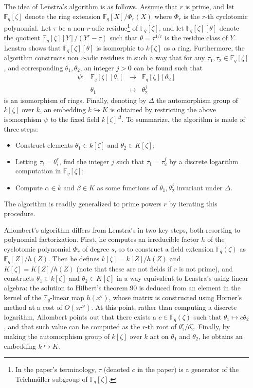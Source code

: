 \documentclass[12pt]{article}
\theoremstyle{plain}
\theoremstyle{definition}
\def\F{\ensuremath{\mathbb{F}}}
\newcounter{algorithm}
\begin{document}
The idea of Lenstra's algorithm is as follows.
Assume that $r$ is prime, and
let $\F_q[\zeta]$ denote the ring extension $\F_q[X] / \Phi_r(X)$ where $\Phi_r$ is the $r$-th 
cyclotomic polynomial. 
Let $\tau$ be a non $r$-adic residue\footnote{In the paper's terminology, $\tau$ (denoted $c$ in the paper) is a generator of the Teichm\"uller subgroup of $\F_q[\zeta]$.} of $\F_q[\zeta]$,
and let $\F_q[\zeta][\theta]$ denote the quotient $\F_q[\zeta][Y]/(Y^r - 
\tau)$ such that $\theta=\tau^{1/r}$ is the residue class of $Y$.
Lenstra shows that $\F_q[\zeta][\theta]$ is isomorphic to $k[\zeta]$ as a ring.
Furthermore, the algorithm constructs non $r$-adic residues in such a way that for any $\tau_1, \tau_2 \in \F_q[\zeta]$, 
and corresponding $\theta_1, \theta_2$,
an integer $j > 0$  can be found such that
\[
\begin{array}{lrll}
\psi: & \F_q[\zeta][\theta_1] & \rightarrow & \F_q[\zeta][\theta_2] \\
& \theta_1 & \mapsto & \theta_2^j
\end{array}
\]
is an isomorphism of rings.
Finally, denoting by $\Delta$ the automorphism group of $k[\zeta]$
over $k$, an embedding $k \hookrightarrow K$ is obtained by
restricting the above isomorphism $\psi$ to the fixed field
$k[\zeta]^\Delta$.
To summarize, the algorithm is made of three steps:
\begin{itemize}
\item Construct elements $\theta_1\in k[\zeta]$ and $\theta_2\in K[\zeta]$;
\item Letting $\tau_i=\theta_i^r$, find the integer $j$ such that
  $\tau_1=\tau_2^j$ by a discrete logarithm computation in
  $\F_q[\zeta]$;
\item Compute $\alpha\in k$ and $\beta\in K$ as some functions of
  $\theta_1,\theta_2^j$ invariant under $\Delta$.
\end{itemize}
The algorithm is readily generalized to prime powers $r$ by iterating
this procedure.

Allombert's algorithm differs from Lenstra's in two key steps, both
resorting to polynomial factorization.  First, he computes an
irreducible factor $h$ of the cyclotomic polynomial $\Phi_r$
of degree $s$, so to
construct a field extension $\F_q(\zeta)$ as $\F_q[Z]/h(Z)$.  Then he
defines $k[\zeta]=k[Z]/h(Z)$ and $K[\zeta]=K[Z]/h(Z)$ (note that these
are not fields if $r$ is not prime), and constructs
$\theta_1\in k[\zeta]$ and $\theta_2\in K[\zeta]$ in a way equivalent
to Lenstra's using linear algebra:
the solution to Hilbert's theorem 90 is deduced
from an element in the kernel of the $\F_q$-linear map $h(x^q)$,
whose matrix is constructed using
Horner's method at a cost of $O(s r^\omega)$.
At this point, rather than computing a discrete
logarithm, Allombert points out that there exists a $c\in\F_q(\zeta)$
such that $\theta_1\mapsto c\theta_2$, and that such value can be
computed as the $r$-th root of $\theta_1^r/\theta_2^r$.
Finally, by making the automorphism group of $k[\zeta]$ over $k$ act
on $\theta_1$ and $\theta_2$, he obtains an embedding $k \hookrightarrow K$.
\end{document}
